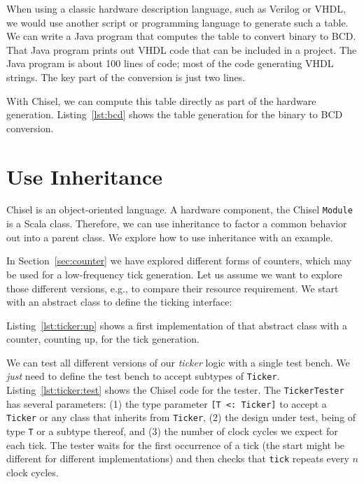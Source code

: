 \documentclass[%
    10pt,
    headinclude, footexclude,
    openright, %
    notitlepage,
    cleardoubleempty,
    headsepline,
    pointlessnumbers,
    bibtotoc, idxtotoc,
    ]{scrbook}
\newcommand{\code}[1]{{\small{\texttt{#1}}}}
\begin{document}
When using a classic hardware description language, such as Verilog or VHDL,
we would use another script or programming language to generate such a table.
We can write a Java program that computes the table to convert binary to BCD.
That Java program prints out VHDL code that can be included in a project.
The Java program is about 100 lines of code; most of the code generating
VHDL strings. The key part of the conversion is just two lines.

With Chisel, we can compute this table directly as part of the hardware generation.
Listing~\ref{lst:bcd} shows the table generation for the binary to BCD conversion.


\section{Use Inheritance}
\label{sec:inheritance}


Chisel is an object-oriented language. A hardware component, the Chisel \code{Module}
is a Scala class. Therefore, we can use inheritance to factor a common behavior
out into a parent class. We explore how to use inheritance with an example.

In Section~\ref{sec:counter} we have explored different forms of counters,
which may be used for a low-frequency tick generation. Let us assume we want to
explore those different versions, e.g., to compare their resource requirement.
We start with an abstract class to define the ticking interface:


\noindent Listing~\ref{lst:ticker:up} shows a first implementation of that abstract class
with a counter, counting up, for the tick generation.


We can test all different versions of our \emph{ticker} logic with a single test bench.
We \emph{just} need to define the test bench to accept subtypes of \code{Ticker}.
Listing~\ref{lst:ticker:test} shows the Chisel code for the tester.
The \code{TickerTester} has several parameters: (1) the type parameter
\code{[T <: Ticker]} to accept a \code{Ticker} or any class that inherits from \code{Ticker},
(2) the design under test, being of type \code{T} or a subtype thereof,
and (3) the number of clock cycles we expect for each tick.
The tester waits for the first occurrence of a tick (the start might be different for
different implementations) and then checks that \code{tick} repeats every $n$ clock cycles.
\end{document}
